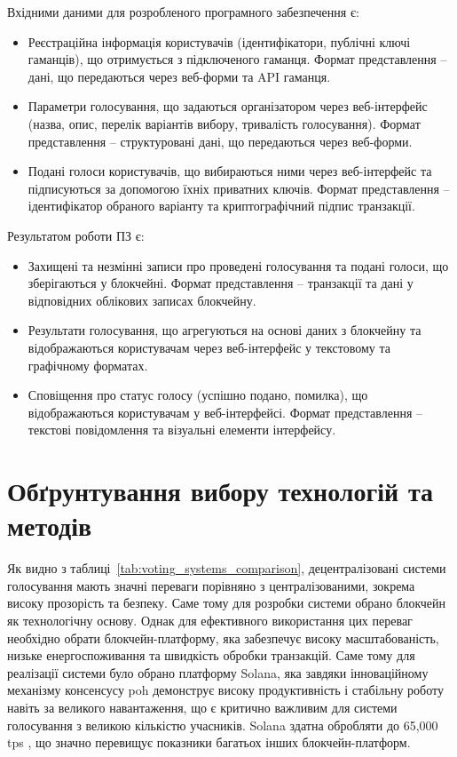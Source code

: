 \documentclass[14pt]{extreport}
\begin{document}
  Вхідними даними для розробленого програмного забезпечення є:
  
  \begin{itemize}
    \item Реєстраційна інформація користувачів (ідентифікатори, публічні ключі гаманців), що отримується з підключеного гаманця. Формат представлення – дані, що передаються через веб-форми та API гаманця.
    \item Параметри голосування, що задаються організатором через веб-інтерфейс (назва, опис, перелік варіантів вибору, тривалість голосування). Формат представлення – структуровані дані, що передаються через веб-форми.
    \item Подані голоси користувачів, що вибираються ними через веб-інтерфейс та підписуються за допомогою їхніх приватних ключів. Формат представлення – ідентифікатор обраного варіанту та криптографічний підпис транзакції.
  \end{itemize}
  
  Результатом роботи ПЗ є:
  
  \begin{itemize}
    \item Захищені та незмінні записи про проведені голосування та подані голоси, що зберігаються у блокчейні. Формат представлення – транзакції та дані у відповідних облікових записах блокчейну.
    \item Результати голосування, що агрегуються на основі даних з блокчейну та відображаються користувачам через веб-інтерфейс у текстовому та графічному форматах.
    \item Сповіщення про статус голосу (успішно подано, помилка), що відображаються користувачам у веб-інтерфейсі. Формат представлення – текстові повідомлення та візуальні елементи інтерфейсу.
  \end{itemize}
  
  \section{Обґрунтування вибору технологій та методів}
  
  Як видно з таблиці~\ref{tab:voting_systems_comparison}, децентралізовані системи голосування мають значні переваги порівняно з централізованими, зокрема високу прозорість та безпеку. Саме тому для розробки системи обрано блокчейн як технологічну основу. Однак для ефективного використання цих переваг необхідно обрати блокчейн-платформу, яка забезпечує високу масштабованість, низьке енергоспоживання та швидкість обробки транзакцій. Саме тому для реалізації системи було обрано платформу Solana, яка завдяки інноваційному механізму консенсусу \gls{poh} демонструє високу продуктивність і стабільну роботу навіть за великого навантаження, що є критично важливим для системи голосування з великою кількістю учасників. Solana здатна обробляти до 65,000 \gls{tps} \cite{solana_report}, що значно перевищує показники багатьох інших блокчейн-платформ.
\end{document}
